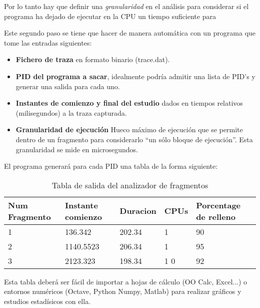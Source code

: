 \documentclass[a4paper,11pt,spanish,twoside]{article}
\begin{document}
Por lo tanto hay que definir una \emph{granularidad} en el análisis
para considerar si el programa ha dejado de ejecutar en la CPU un
tiempo suficiente para 

Este segundo paso se tiene que hacer de manera automática con un
programa que tome las entradas siguientes:

\begin{itemize}
\item \textbf{Fichero de traza} en formato binario (trace.dat).
\item \textbf{PID del programa a sacar}, idealmente podría admitir una
  lista de PID's y generar una salida para cada uno.
\item \textbf{Instantes de comienzo y final del estudio} dados en
  tiempos relativos (milisegundos) a la traza capturada.
\item \textbf{Granularidad de ejecución} Hueco máximo de ejecución que
  se permite dentro de un fragmento para considerarlo ``un sólo bloque
  de ejecución''.  Esta granularidad se mide en microsegundos.
\end{itemize}

El programa generará para cada PID una tabla de la forma siguiente:

\begin{table}
  \centering
  \begin{tabular}[ht]{|p{1in}|p{1in}|p{1in}|p{1in}|p{1in}|}
    \textbf{Num Fragmento} & \textbf{Instante comienzo} &
    \textbf{Duracion} & \textbf{CPUs} & \textbf{Porcentage
      de relleno} \\ \hline
1 & 136.342 & 202.34 & 1 & 90 \\
2 & 1140.5523 & 206.34 & 1 & 95 \\ 
3 & 2123.323 & 198.34 & 1 0 & 92 \\
  \end{tabular}
  \caption{Tabla de salida del analizador de fragmentos}
  \label{tab:analisis}
\end{table}

Esta tabla deberá ser fácil de importar a hojas de cálculo (OO Calc,
Excel...) o entornos numéricos (Octave, Python Numpy, Matlab) para
realizar gráficos y estudios estadísicos con ella.



% 
% 
\end{document}
